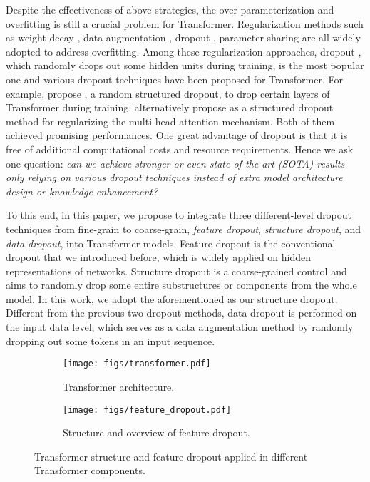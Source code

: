 \documentclass[11pt]{article}
\begin{document}
Despite the effectiveness of above strategies, the over-parameterization and overfitting is still a crucial problem for Transformer. Regularization methods such as weight decay \cite{krogh1992simple}, data augmentation \cite{sennrich2016improving}, dropout \cite{srivastava2014dropout}, parameter sharing \cite{dehghani2018universal,xia2019tied} are all widely adopted to address overfitting.
Among these regularization approaches, dropout \cite{srivastava2014dropout}, which randomly drops out some hidden units during training, is the most popular one and various dropout techniques have been proposed for Transformer. For example, \citet{fan2019reducing} propose , a random structured dropout, to drop certain layers of Transformer during training. \citet{zhou2020scheduled} alternatively propose  as a structured dropout method for regularizing the multi-head attention mechanism. Both of them achieved promising performances. One great advantage of dropout is that it is free of additional computational costs and resource requirements. Hence we ask one question: \textit{can we achieve stronger or even state-of-the-art (SOTA) results only relying on various dropout techniques instead of extra model architecture design or knowledge enhancement?}


To this end, in this paper, we propose  to integrate three different-level dropout techniques from fine-grain to coarse-grain, \emph{feature dropout}, \emph{structure dropout}, and \emph{data dropout}, into Transformer models. Feature dropout is the conventional dropout \cite{srivastava2014dropout} that we introduced before, which is widely applied on hidden representations of networks. Structure dropout is a coarse-grained control and aims to randomly drop some entire substructures or components from the whole model. In this work, we adopt the aforementioned  \cite{fan2019reducing} as our structure dropout. Different from the previous two dropout methods, data dropout \cite{iyyer2015deep} is performed on the input data level, which serves as a data augmentation method by randomly dropping out some tokens in an input sequence. 


\begin{figure*}
     \centering
     \begin{subfigure}[b]{0.35\linewidth}
         \centering
         \texttt{[image: figs/transformer.pdf]}
         \caption{Transformer architecture.}
         \label{fig:transformer}
     \end{subfigure}
     \hfill
     \begin{subfigure}[b]{0.55\linewidth}
         \centering
         \texttt{[image: figs/feature\_dropout.pdf]}
         \caption{Structure and overview of feature dropout.}
         \label{fig:feature_dropout}
     \end{subfigure}
        \caption{Transformer structure and feature dropout applied in different Transformer components.}
        \label{fig:transformer_feature_dropout}
\end{figure*}
\end{document}
